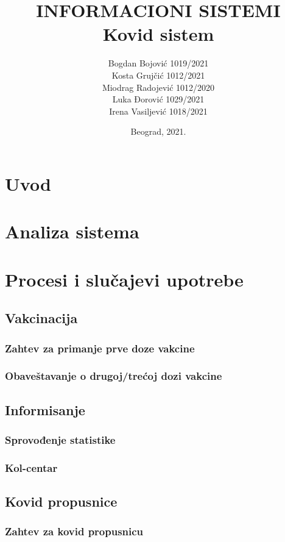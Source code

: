 \documentclass[titlepage]{article}
\title{INFORMACIONI SISTEMI\\Kovid sistem}
\author{
Bogdan Bojović 1019/2021\\
Kosta Grujčić 1012/2021\\
Miodrag Radojević 1012/2020\\
Luka Đorović 1029/2021\\
Irena Vasiljević 1018/2021
}
\date{Beograd, 2021.}
\begin{document}
\maketitle
\tableofcontents

\newpage

\section{Uvod}

\section{Analiza sistema}

\section{Procesi i slučajevi upotrebe}

\subsection{Vakcinacija}
\subsubsection{Zahtev za primanje prve doze vakcine}
\subsubsection{Obaveštavanje o drugoj/trećoj dozi vakcine}

\subsection{Informisanje}
\subsubsection{Sprovođenje statistike}
\subsubsection{Kol-centar}

\subsection{Kovid propusnice}
\subsubsection{Zahtev za kovid propusnicu}
\end{document}
